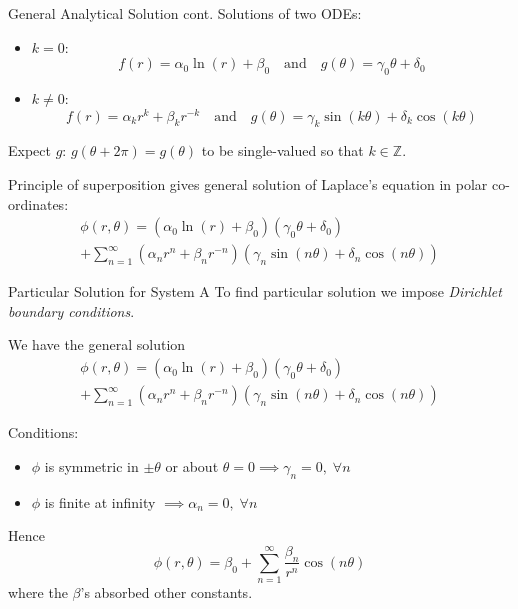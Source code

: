 \documentclass{beamer}
\newcommand{\be}{\begin{equation}}
\newcommand{\ee}{\end{equation}}
\begin{document}
\begin{frame}{General Analytical Solution cont.}
Solutions of two ODEs:
\begin{itemize}
\item $k=0$:
\be
f(r)=\alpha_0 \ln(r) + \beta_0  \quad \text{and} \quad g(\theta)=\gamma_0 \theta +\delta_0
\ee
\item $k \neq 0$:
\be
f(r)=\alpha_k r^k +\beta_k r^{-k} \quad \text{and} \quad g(\theta) = \gamma_k \sin(k\theta) +\delta_k \cos(k\theta)
\ee
\end{itemize}

Expect $g$: $g(\theta+2\pi)=g(\theta)$ to be single-valued so that $k \in \mathbb{Z}$.

Principle of superposition gives general solution of Laplace's equation in polar
co-ordinates:
%
\begin{multline}
\phi(r, \theta) = (\alpha_0 \ln(r) + \beta_0)(\gamma_0\theta + \delta_0) \\
                + \sum_{n=1}^{\infty}(\alpha_n r^n+\beta_n r^{-n})(\gamma_n \sin(n\theta) + \delta_n \cos(n\theta))
\end{multline}

\end{frame}

\begin{frame}{Particular Solution for System A}
To find particular solution we impose \emph{Dirichlet boundary conditions}.

We have the general solution
%
\begin{multline}
\phi(r, \theta) = (\alpha_0 \ln(r) + \beta_0)(\gamma_0\theta + \delta_0) \\
                + \sum_{n=1}^{\infty}(\alpha_n r^n+\beta_n r^{-n})(\gamma_n \sin(n\theta) + \delta_n \cos(n\theta))
\end{multline}

Conditions:
\begin{itemize}
\item $\phi$ is symmetric in $\pm\theta$ or about $\theta=0 \implies \gamma_n=0, \; \forall n$
\item $\phi$ is finite at infinity $\implies \alpha_n=0, \; \forall n$
\end{itemize}

Hence
%
\be
\phi(r, \theta) = \beta_0 + \sum_{n=1}^{\infty} \frac{\beta_n}{r^n} \cos(n\theta)
\ee
%
where the $\beta$'s absorbed other constants.
\end{frame}
\end{document}

